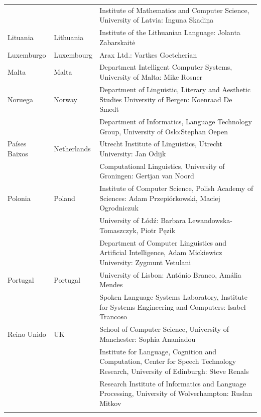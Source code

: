 \begin{longtable}{@{}llp{113mm}@{}}
  & & Institute of Mathematics and Computer Science, University of Latvia: Inguna Skadiņa\\ \addlinespace
  Lituania & \textcolor{grey1}{Lithuania} & Institute of the Lithuanian Language: Jolanta Zabarskaitė\\ \addlinespace
  Luxemburgo  & \textcolor{grey1}{Luxembourg} & Arax Ltd.: Vartkes Goetcherian\\ \addlinespace
  Malta & \textcolor{grey1}{Malta} & Department Intelligent Computer Systems, University of Malta: Mike Rosner\\ \addlinespace
  Noruega   & \textcolor{grey1}{Norway} & Department of Linguistic, Literary and Aesthetic Studies University of Bergen: \newline Koenraad De Smedt\\ \addlinespace 
  & & Department of Informatics, Language Technology Group, University of Oslo:\newline Stephan Oepen \\ \addlinespace
  Países Baixos & \textcolor{grey1}{Netherlands} & Utrecht Institute of Linguistics, Utrecht University: Jan Odijk\\ \addlinespace 
  & & Computational Linguistics, University of Groningen: Gertjan van Noord\\ \addlinespace
  Polonia & \textcolor{grey1}{Poland} & Institute of Computer Science, Polish Academy of Sciences: Adam Przepiórkowski, Maciej Ogrodniczuk \\ \addlinespace
  & & University of Łódź: Barbara Lewandowska-Tomaszczyk, Piotr Pęzik\\ \addlinespace
  & & Department of Computer Linguistics and Artificial Intelligence, Adam Mickiewicz University: Zygmunt Vetulani \\ \addlinespace
  Portugal & \textcolor{grey1}{Portugal} & University of Lisbon: António Branco, Amália Mendes \\ \addlinespace
  & & Spoken Language Systems Laboratory, Institute for Systems Engineering and Computers: Isabel Trancoso \\ \addlinespace
  Reino Unido & \textcolor{grey1}{UK} & School of Computer Science, University of Manchester: Sophia Ananiadou \\ \addlinespace 
  & & Institute for Language, Cognition and Computation, Center for Speech Technology Research, University of Edinburgh: Steve Renals \\ \addlinespace 
  & & Research Institute of Informatics and Language Processing, University of Wolverhampton: Ruslan Mitkov \\ \addlinespace 

\end{longtable}
